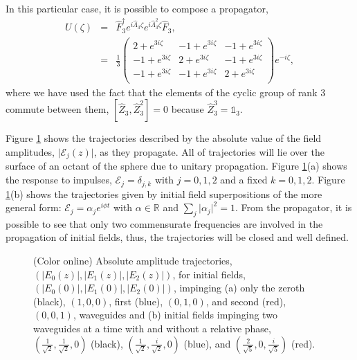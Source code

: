 \documentclass[9pt,twocolumn,twoside]{osajnl}
\begin{document}
In this particular case, it is possible to compose a propagator,
\begin{eqnarray}
U(\zeta) &=& \hat{F}_{3}^{\dagger} e^{i \hat{\Lambda}_{3} \zeta} e^{i \hat{\Lambda}_{3}^{2} \zeta} \hat{F}_{3}, \nonumber \\
&=& \frac{1}{3}\left(
\begin{array}{ccc}
 2+e^{3 i \zeta} & -1+e^{3 i \zeta} & -1+e^{3 i \zeta} \\
 -1+e^{3 i \zeta} & 2+e^{3 i \zeta} & -1+e^{3 i \zeta} \\
 -1+e^{3 i \zeta} & -1+e^{3 i \zeta} & 2+e^{3 i \zeta} \\
\end{array}
\right) e^{-i \zeta},
\end{eqnarray}
where we have used the fact that the elements of the cyclic group of rank $3$ commute between them, $\left[ \hat{Z}_{3} , \hat{Z}_{3}^{2} \right] = 0$ because $\hat{Z}_{3}^{3} = \mathbb{1}_{3}$.  

Figure \ref{fig: Fig3} shows the trajectories described by the absolute value of the field amplitudes, $\vert \mathcal{E}_{j}(z)\vert$, as they propagate. 
All of trajectories will lie over the surface of an octant of the sphere due to unitary propagation.
Figure \ref{fig: Fig3}(a) shows the response to impulses, $\mathcal{E}_{j} = \delta_{j,k}$ with $j=0,1,2$ and a fixed $k=0,1,2$. 
Figure \ref{fig: Fig3}(b) shows the trajectories given by initial field superpositions of the more general form: $\mathcal{E}_{j} = \alpha_{j} e^{i \phi t}$ with $\alpha \in \mathbb{R}$ and $\sum_{j} \vert \alpha_{j} \vert^{2} =1$.
From the propagator, it is possible to see that only two commensurate frequencies are involved in the propagation of initial fields, thus, the trajectories will be closed and well defined.


\begin{figure}[htbp]
\centering
{}
\caption{(Color online) Absolute amplitude trajectories, $(\vert E_{0}(z) \vert, \vert E_{1}(z) \vert, \vert E_{2}(z) \vert )$, for initial fields, $(\vert E_{0}(0) \vert, \vert E_{1}(0) \vert, \vert E_{2}(0) \vert )$, impinging (a) only the zeroth (black), $(1,0,0)$, first (blue), $(0,1,0)$, and second (red), $(0,0,1)$, waveguides and (b) initial fields impinging two waveguides at a time with and without a relative phase, $(\frac{1}{\sqrt{2}},\frac{1}{\sqrt{2}},0)$ (black), $(\frac{1}{\sqrt{2}},\frac{i}{\sqrt{2}},0)$ (blue), and $(\frac{2}{\sqrt{5}},0,\frac{i}{\sqrt{5}})$ (red).}
\label{fig: Fig3}
\end{figure}
\end{document}
